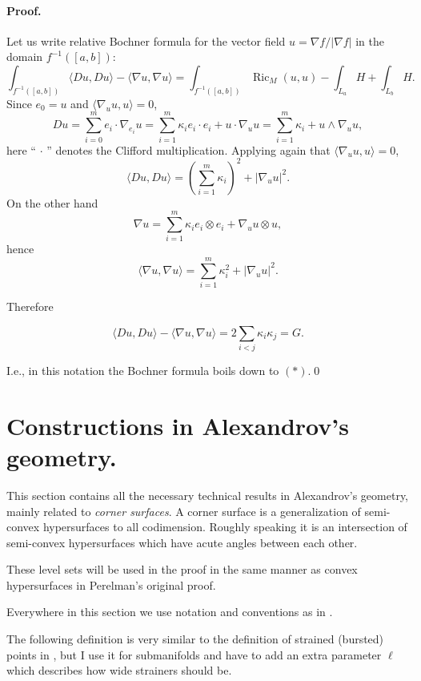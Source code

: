 \documentclass{article}
\def\l{\left}
\def\r{\right}
\def\<{\langle}
\def\>{\rangle}
\def\Ric{\operatorname{Ric}}
\begin{document}
\paragraph*{Proof.} Let us write relative Bochner formula for the vector field
$u=\nabla f/|\nabla f|$ in the domain $f^{-1}([a,b])$:
$$
\int_{f^{-1}([a,b])}\langle Du,Du \rangle
-
\langle \nabla u,\nabla u \rangle
=
\int_{f^{-1}([a,b])} \Ric_M( u, u)-\int_{L_a}H+\int_{L_b}H.
$$
Since $e_0=u$ and $\<\nabla_u u,u\>=0$,
$$ Du=\sum_{i=0}^{m} e_i\cdot \nabla_{e_i}u=
\sum_{i=1}^{m}\kappa_i e_i\cdot e_i+u\cdot \nabla_{u}u=
\sum_{i=1}^{m}\kappa_i+u\wedge\nabla_{u}u,$$
here ``$\,\cdot\,$'' denotes the Clifford multiplication.
Applying again that $\<\nabla_u u,u\>=0$,
$$ \langle Du,Du \rangle=\l(\sum_{i=1}^{m}\kappa_i\r)^2+|\nabla_{u}u|^2.$$
On the other hand
$$\nabla u=\sum_{i=1}^m\kappa_ie_i\otimes e_i+\nabla_u u\otimes u,$$
hence
$$\langle\nabla u,\nabla u\rangle =
\sum_{i=1}^{m}\kappa_i^2+|\nabla_{u}u|^2.$$

Therefore

$$\langle D u,D u\rangle-\langle \nabla u,\nabla u \rangle =2\sum_{i<j}\kappa_i\kappa_j=G.$$

I.e., in this notation the Bochner formula boils down to $(*)$.\qed

\section{Constructions in Alexandrov's geometry.}

This section contains all the necessary technical results in Alexandrov's geometry,
mainly related to {\it corner surfaces}.
A corner surface is a generalization of semi-convex hypersurfaces to all codimension.
Roughly speaking it is an intersection of semi-convex hypersurfaces which have acute angles
between each other.

These level sets will be used in the proof in the same manner as convex hypersurfaces in Perelman's original proof.

Everywhere in this section we use notation and conventions as in  \cite{petrunin-2}.

The following definition is very similar to the definition of strained (bursted) points
in \cite{BGP}, but I use it for submanifolds and have to add an extra parameter
$\ell$ which describes how wide strainers should be.
\end{document}
